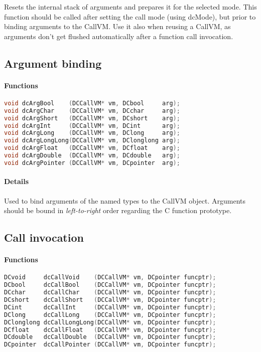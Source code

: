 Resets the internal stack of arguments and prepares it for the selected mode.
This function should be called after setting the call mode (using dcMode), but
prior to binding arguments to the CallVM. Use it also when reusing a CallVM, as
arguments don't get flushed automatically after a function call invocation.\\

\subsection{Argument binding}

\paragraph{Functions}

\begin{lstlisting}[language=c]
void dcArgBool    (DCCallVM* vm, DCbool     arg);
void dcArgChar    (DCCallVM* vm, DCchar     arg);
void dcArgShort   (DCCallVM* vm, DCshort    arg);
void dcArgInt     (DCCallVM* vm, DCint      arg);
void dcArgLong    (DCCallVM* vm, DClong     arg);
void dcArgLongLong(DCCallVM* vm, DClonglong arg);
void dcArgFloat   (DCCallVM* vm, DCfloat    arg);
void dcArgDouble  (DCCallVM* vm, DCdouble   arg);
void dcArgPointer (DCCallVM* vm, DCpointer  arg);
\end{lstlisting}

\paragraph{Details}

Used to bind arguments of the named types to the CallVM object.
Arguments should be bound in \emph{left-to-right} order regarding the C
function prototype.\\

\subsection{Call invocation}

\paragraph{Functions}

\begin{lstlisting}[language=c]
DCvoid     dcCallVoid    (DCCallVM* vm, DCpointer funcptr);
DCbool     dcCallBool    (DCCallVM* vm, DCpointer funcptr);
DCchar     dcCallChar    (DCCallVM* vm, DCpointer funcptr);
DCshort    dcCallShort   (DCCallVM* vm, DCpointer funcptr);
DCint      dcCallInt     (DCCallVM* vm, DCpointer funcptr);
DClong     dcCallLong    (DCCallVM* vm, DCpointer funcptr);
DClonglong dcCallLongLong(DCCallVM* vm, DCpointer funcptr);
DCfloat    dcCallFloat   (DCCallVM* vm, DCpointer funcptr);
DCdouble   dcCallDouble  (DCCallVM* vm, DCpointer funcptr);
DCpointer  dcCallPointer (DCCallVM* vm, DCpointer funcptr);
\end{lstlisting}

